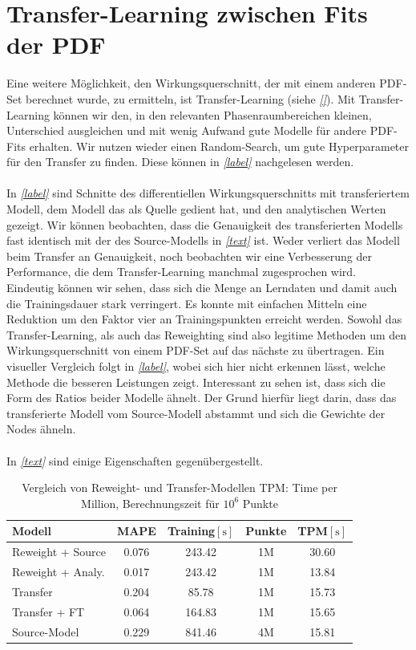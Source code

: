 \section{Transfer-Learning zwischen Fits der PDF}
Eine weitere Möglichkeit, den Wirkungsquerschnitt, der mit einem anderen PDF-Set berechnet wurde, zu ermitteln, ist Transfer-Learning (siehe \textit{\autoref{}}). Mit Transfer-Learning können wir den, in den relevanten Phasenraumbereichen kleinen, Unterschied ausgleichen und mit wenig Aufwand gute Modelle für andere PDF-Fits erhalten. Wir nutzen wieder einen Random-Search, um gute Hyperparameter für den Transfer zu finden. Diese können in \textit{\autoref{label}} nachgelesen werden.\\
\\
In \textit{\autoref{label}} sind Schnitte des differentiellen Wirkungsquerschnitts mit transferiertem Modell, dem Modell das als Quelle gedient hat, und den analytischen Werten gezeigt. Wir können beobachten, dass die Genauigkeit des transferierten Modells fast identisch mit der des Source-Modells in \textit{\autoref{text}} ist. Weder verliert das Modell beim Transfer an Genauigkeit, noch beobachten wir eine Verbesserung der Performance, die dem Transfer-Learning manchmal zugesprochen wird.\\
Eindeutig können wir sehen, dass sich die Menge an Lerndaten und damit auch die Trainingsdauer stark verringert. Es konnte mit einfachen Mitteln eine Reduktion um den Faktor vier an Trainingspunkten erreicht werden. Sowohl das Transfer-Learning, als auch das Reweighting sind also legitime Methoden um den Wirkungsquerschnitt von einem PDF-Set auf das nächste zu übertragen. Ein visueller Vergleich folgt in \textit{\autoref{label}}, wobei sich hier nicht erkennen lässt, welche Methode die besseren Leistungen zeigt. Interessant zu sehen ist, dass sich die Form des Ratios beider Modelle ähnelt. Der Grund hierfür liegt darin, dass das transferierte Modell vom Source-Modell abstammt und sich die Gewichte der Nodes ähneln.\\
\\
In \textit{\autoref{text}} sind einige Eigenschaften gegenübergestellt.
\begin{table} %
	\centering
	\begin{tabular}{|l|c|c|c|c|}
		\hline
		Modell & MAPE & Training$[\text{s}]$ & Punkte & TPM$[\text{s}]$ \\
		\hline
		Reweight + Source & 0.076 & 243.42 & 1M & 30.60 \\
		Reweight + Analy. &  0.017 & 243.42 & 1M & 13.84 \\
		Transfer & 0.204 & 85.78 & 1M & 15.73\\
		Transfer + FT & 0.064 & 164.83 & 1M & 15.65 \\
		Source-Model & 0.229 & 841.46 & 4M & 15.81\\
		\hline
	\end{tabular}
	\caption{Vergleich von Reweight- und Transfer-Modellen TPM: Time per Million, Berechnungszeit für $10^{6}$ Punkte}
\end{table}
